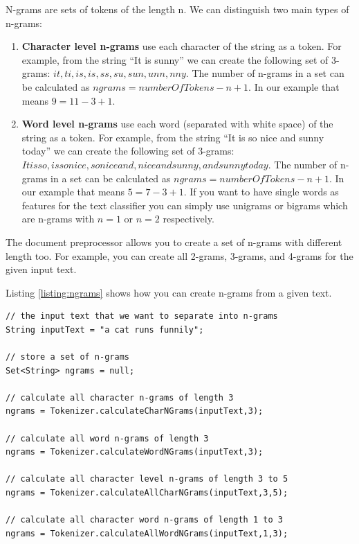 \documentclass[a4paper,twoside]{book}      %
\begin{document}
N-grams are sets of tokens of the length n. We can distinguish two main types of n-grams:

\begin{enumerate}
\item \textbf{Character level n-grams} use each character of the string as a token. For example, from the string ``It is sunny'' we can create the following set of 3-grams: ${it ,t i, is,is ,s s, su,sun,unn,nny}$. The number of n-grams in a set can be calculated as $ngrams = numberOfTokens - n + 1$. In our example that means $9 = 11 - 3 + 1$.
\item \textbf{Word level n-grams} use each word (separated with white space) of the string as a token. For example, from the string ``It is so nice and sunny today'' we can create the following set of 3-grams: ${It is so,is so nice,so nice and,nice and sunny,and sunny today}$. The number of n-grams in a set can be calculated as $ngrams = numberOfTokens - n + 1$. In our example that means $5 = 7 - 3 + 1$. If you want to have single words as features for the text classifier you can simply use unigrams or bigrams which are n-grams with $n=1$ or $n=2$ respectively.
\end{enumerate}

The document preprocessor allows you to create a set of n-grams with different length too. For example, you can create all 2-grams, 3-grams, and 4-grams for the given input text.

Listing \ref{listing:ngrams} shows how you can create n-grams from a given text.

\begin{codelisting}
\label{listing:ngrams}
\begin{lstlisting}[frame=tb]
// the input text that we want to separate into n-grams
String inputText = "a cat runs funnily";

// store a set of n-grams
Set<String> ngrams = null;

// calculate all character n-grams of length 3
ngrams = Tokenizer.calculateCharNGrams(inputText,3);

// calculate all word n-grams of length 3
ngrams = Tokenizer.calculateWordNGrams(inputText,3);

// calculate all character level n-grams of length 3 to 5
ngrams = Tokenizer.calculateAllCharNGrams(inputText,3,5);

// calculate all character word n-grams of length 1 to 3
ngrams = Tokenizer.calculateAllWordNGrams(inputText,1,3);
\end{lstlisting}
\end{codelisting}
\end{document}
